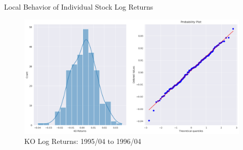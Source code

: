 \documentclass[presentation]{beamer}
\begin{document}
\begin{frame}[label={sec:org056754f}]{Local Behavior of Individual Stock Log Returns}
\begin{figure}[htbp]
\centering
\includegraphics[width=.9\linewidth]{./figures/ko-normal.png}
\caption{KO Log Returns: 1995/04 to 1996/04}
\end{figure}
\end{frame}
\end{document}

